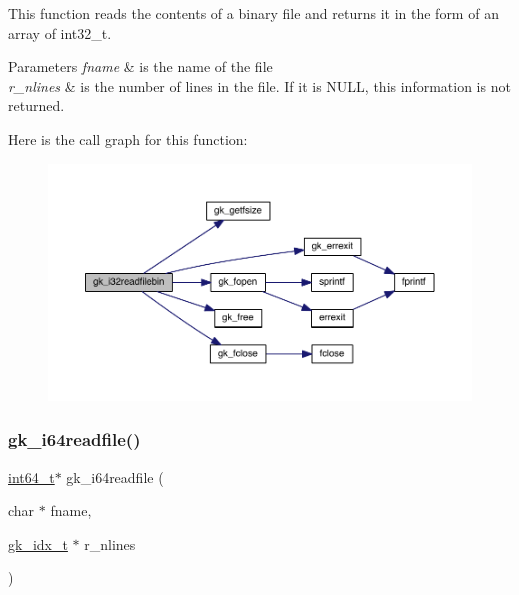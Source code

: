 This function reads the contents of a binary file and returns it in the form of an array of int32\+\_\+t. 
\begin{DoxyParams}{Parameters}
{\em fname} & is the name of the file \\
\hline
{\em r\+\_\+nlines} & is the number of lines in the file. If it is N\+U\+LL, this information is not returned. \\
\hline
\end{DoxyParams}
Here is the call graph for this function\+:\nopagebreak
\begin{figure}[H]
\begin{center}
\leavevmode
\includegraphics[width=350pt]{a00855_afbb9b4e2327d298a79924028441a0fdb_cgraph}
\end{center}
\end{figure}
\mbox{\label{a00855_a8cb19aa95a831aa745f6e04e1cc0b204}} 
\subsubsection{\texorpdfstring{gk\+\_\+i64readfile()}{gk\_i64readfile()}}
{\footnotesize\ttfamily \hyperlink{a00119_a67a9885ef4908cb72ce26d75b694386c}{int64\+\_\+t}$\ast$ gk\+\_\+i64readfile (\begin{DoxyParamCaption}\item[{char $\ast$}]{fname,  }\item[{\hyperlink{a00083_a899f9d8c47b1ca0c2fead41097f4bde2}{gk\+\_\+idx\+\_\+t} $\ast$}]{r\+\_\+nlines }\end{DoxyParamCaption})}

